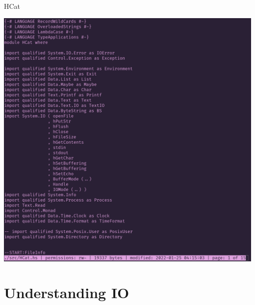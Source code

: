 \documentclass[10pt, presentation, colorlinks]{beamer}
\begin{document}
\begin{frame}[label={sec:org77d8925}]{HCat}
\begin{center}
\includegraphics[height=0.7\textheight]{./img/hcat-screen.png}
\end{center}
\end{frame}

\section{Understanding IO}
\label{sec:orgc857986}
\end{document}
